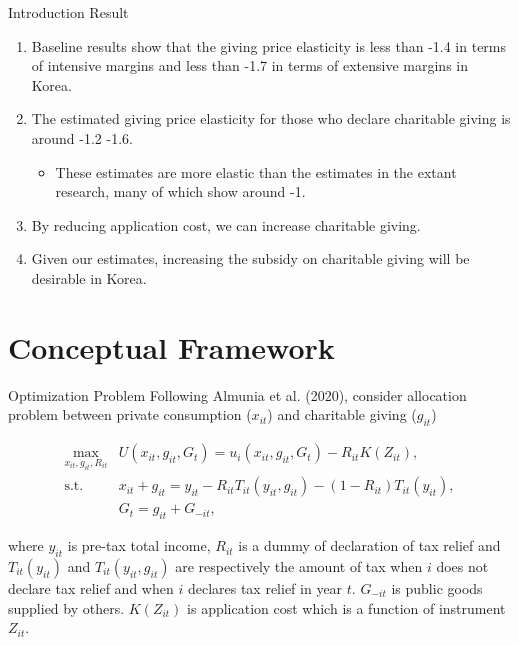 \documentclass[
  ignorenonframetext,
  aspectratio=169,
]{beamer}
\providecommand{\tightlist}{%
  \setlength{\itemsep}{0pt}\setlength{\parskip}{0pt}}
\begin{document}
\begin{frame}{Introduction}
\protect\hypertarget{introduction-2}{}
Result

\begin{enumerate}
\tightlist
\item
  Baseline results show that the giving price elasticity is less than -1.4 in terms of intensive margins and less than -1.7 in terms of extensive margins in Korea.
\item
  The estimated giving price elasticity for those who declare charitable giving is around -1.2 -1.6.

  \begin{itemize}
  \tightlist
  \item
    These estimates are more elastic than the estimates in the extant research, many of which show around -1.
  \end{itemize}
\item
  By reducing application cost, we can increase charitable giving.
\item
  Given our estimates, increasing the subsidy on charitable giving will be desirable in Korea.
\end{enumerate}
\end{frame}

\hypertarget{conceptual-framework}{%
\section{Conceptual Framework}\label{conceptual-framework}}

\begin{frame}{Optimization Problem}
\protect\hypertarget{optimization-problem}{}
Following Almunia et al. (2020),
consider allocation problem between private consumption (\(x_{it}\)) and charitable giving (\(g_{it}\))

\begin{align}
  \max_{x_{it}, g_{it}, R_{it}} &U(x_{it}, g_{it}, G_t)
  = u_i(x_{it}, g_{it}, G_t) - R_{it}K(Z_{it}), \\
  \text{s.t.}\:\:
  &x_{it} + g_{it}
  = y_{it} - R_{it} T_{it}(y_{it}, g_{it}) - (1 - R_{it}) T_{it}(y_{it}), \\
  &G_t = g_{it} + G_{-it},
\end{align}

where \(y_{it}\) is pre-tax total income, \(R_{it}\) is a dummy of declaration of tax relief and \(T_{it}(y_{it})\) and \(T_{it}(y_{it}, g_{it})\) are respectively the amount of tax when \(i\) does not declare tax relief and when \(i\) declares tax relief in year \(t\). \(G_{-it}\) is public goods supplied by others. \(K(Z_{it})\) is application cost which is a function of instrument \(Z_{it}\).
\end{frame}
\end{document}
